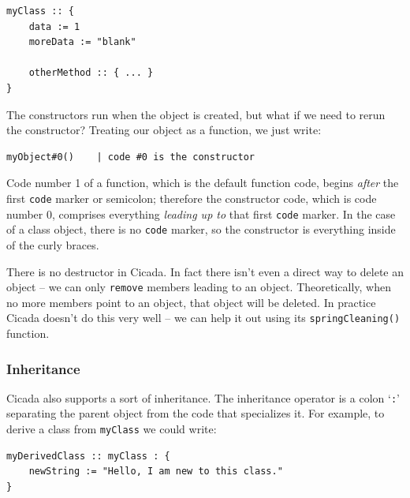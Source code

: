 \documentclass{article}
\newenvironment{code}{
       \begin{list}{}{
               \setlength{\leftmargin}{.4in}
               \setlength{\rightmargin}{0in}
               \setlength{\topsep}{.2in}
       }
       \small
       \item[] }
       { \end{list}   }
\begin{document}
\begin{code} \begin{verbatim}
myClass :: {
    data := 1
    moreData := "blank"
    
    otherMethod :: { ... }
}
\end{verbatim} \end{code}

\noindent The constructors run when the object is created, but what if we need to rerun the constructor?  Treating our object as a function, we just write:

\begin{code} \begin{verbatim}
myObject#0()    | code #0 is the constructor
\end{verbatim} \end{code}

\noindent Code number 1 of a function, which is the default function code, begins \emph{after} the first \verb#code# marker or semicolon; therefore the constructor code, which is code number 0, comprises everything \emph{leading up to} that first \verb#code# marker.  In the case of a class object, there is no \verb#code# marker, so the constructor is everything inside of the curly braces.

There is no destructor in Cicada.  In fact there isn't even a direct way to delete an object -- we can only \verb#remove# members leading to an object.  Theoretically, when no more members point to an object, that object will be deleted.  In practice Cicada doesn't do this very well -- we can help it out using its \texttt{springCleaning()} function.








\subsubsection{Inheritance}

Cicada also supports a sort of inheritance.  The inheritance operator is a colon `\verb#:#' separating the parent object from the code that specializes it.  For example, to derive a class from \verb#myClass# we could write:

\begin{code} \begin{verbatim}
myDerivedClass :: myClass : {
    newString := "Hello, I am new to this class."
}
\end{verbatim} \end{code}
\end{document}
